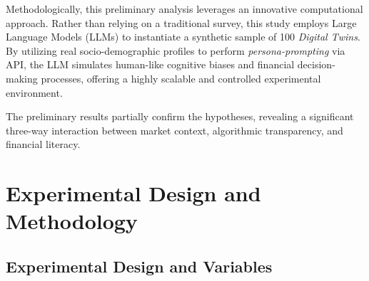 \documentclass[10pt, a4paper]{article} %
\begin{document}
Methodologically, this preliminary analysis leverages an innovative computational approach. Rather than relying on a traditional survey, this study employs Large Language Models (LLMs) to instantiate a synthetic sample of 100 \textit{Digital Twins}. By utilizing real socio-demographic profiles to perform \textit{persona-prompting} via API, the LLM simulates human-like cognitive biases and financial decision-making processes, offering a highly scalable and controlled experimental environment.

The preliminary results partially confirm the hypotheses, revealing a significant three-way interaction between market context, algorithmic transparency, and financial literacy.

\section{Experimental Design and Methodology}

\subsection{Experimental Design and Variables}
\end{document}
